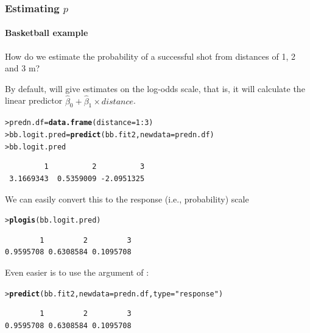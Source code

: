 \documentclass{beamer}\usepackage[]{graphicx}\usepackage[]{xcolor}
\makeatletter
\newcommand{\hlnum}[1]{\textcolor[rgb]{0.686,0.059,0.569}{#1}}%
\newcommand{\hlstr}[1]{\textcolor[rgb]{0.192,0.494,0.8}{#1}}%
\newcommand{\hlopt}[1]{\textcolor[rgb]{0,0,0}{#1}}%
\newcommand{\hlstd}[1]{\textcolor[rgb]{0.345,0.345,0.345}{#1}}%
\newcommand{\hlkwb}[1]{\textcolor[rgb]{0.69,0.353,0.396}{#1}}%
\newcommand{\hlkwc}[1]{\textcolor[rgb]{0.333,0.667,0.333}{#1}}%
\newcommand{\hlkwd}[1]{\textcolor[rgb]{0.737,0.353,0.396}{\textbf{#1}}}%
\newenvironment{kframe}{%
 \def\at@end@of@kframe{}%
 \ifinner\ifhmode%
  \def\at@end@of@kframe{\end{minipage}}%
  \begin{minipage}{\columnwidth}%
 \fi\fi%
 \def\FrameCommand##1{\hskip\@totalleftmargin \hskip-\fboxsep
 \colorbox{shadecolor}{##1}\hskip-\fboxsep
     \hskip-\linewidth \hskip-\@totalleftmargin \hskip\columnwidth}%
 \MakeFramed {\advance\hsize-\width
   \@totalleftmargin\z@ \linewidth\hsize
   \@setminipage}}%
 {\par\unskip\endMakeFramed%
 \at@end@of@kframe}
\newenvironment{knitrout}{}{} %
\makeatother
\begin{document}
\begin{frame}[fragile]
\frametitle{Estimating $p$}
\framesubtitle{Basketball example}
How do we estimate the probability of a successful shot from distances of 1, 2 and 3 m?
\medskip

By default,  will give estimates on the log-odds scale, that is, it will calculate the linear predictor $\hat{\beta}_0+\hat{\beta}_1 \times distance$.

\begin{knitrout}\scriptsize
{}\color{fgcolor}\begin{kframe}
\begin{alltt}
\hlstd{> }\hlstd{predn.df}\hlkwb{=}\hlkwd{data.frame}\hlstd{(}\hlkwc{distance} \hlstd{=} \hlnum{1}\hlopt{:}\hlnum{3}\hlstd{)}
\hlstd{> }\hlstd{bb.logit.pred} \hlkwb{=} \hlkwd{predict}\hlstd{(bb.fit2,} \hlkwc{newdata} \hlstd{= predn.df)}
\hlstd{> }\hlstd{bb.logit.pred}
\end{alltt}
\begin{verbatim}
         1          2          3 
 3.1669343  0.5359009 -2.0951325 
\end{verbatim}
\end{kframe}
\end{knitrout}
We can easily convert this to the response (i.e., probability) scale

\begin{knitrout}\scriptsize
{}\color{fgcolor}\begin{kframe}
\begin{alltt}
\hlstd{> }\hlkwd{plogis}\hlstd{(bb.logit.pred)}
\end{alltt}
\begin{verbatim}
        1         2         3 
0.9595708 0.6308584 0.1095708 
\end{verbatim}
\end{kframe}
\end{knitrout}

Even easier is to use the  argument of :
\begin{knitrout}\scriptsize
{}\color{fgcolor}\begin{kframe}
\begin{alltt}
\hlstd{> }\hlkwd{predict}\hlstd{(bb.fit2,} \hlkwc{newdata} \hlstd{= predn.df,} \hlkwc{type}\hlstd{=}\hlstr{"response"}\hlstd{)}
\end{alltt}
\begin{verbatim}
        1         2         3 
0.9595708 0.6308584 0.1095708 
\end{verbatim}
\end{kframe}
\end{knitrout}

\end{frame}
\end{document}
